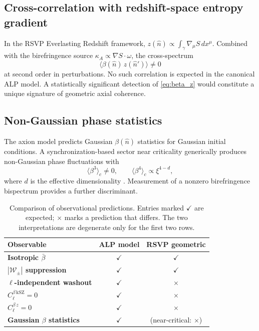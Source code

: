 \documentclass[12pt]{article}
\theoremstyle{definition}
\newcommand{\kA}{\kappa_A}
\newcommand{\Wpm}{\mathcal{W}_\pm}
\begin{document}
\subsection{Cross-correlation with redshift-space entropy gradient}

In the RSVP Everlasting Redshift framework, $z(\hat{n})\propto
\int_\gamma\nabla_\mu S\,dx^\mu$.
Combined with the birefringence source $\kA\propto\nabla S\cdot\omega$,
the cross-spectrum
\begin{equation}
  \langle\beta(\hat{n})\,z(\hat{n}')\rangle\neq0
  \label{eq:beta_z}
\end{equation}
at second order in perturbations.
No such correlation is expected in the canonical ALP model.
A statistically significant detection of \eqref{eq:beta_z} would
constitute a unique signature of geometric axial coherence.

\subsection{Non-Gaussian phase statistics}

The axion model predicts Gaussian $\beta(\hat{n})$ statistics for Gaussian
initial conditions.
A synchronization-based sector near criticality generically produces
non-Gaussian phase fluctuations with
\begin{equation}
  \langle\beta^3\rangle_c\neq0,
  \qquad
  \langle\beta^4\rangle_c\propto\xi^{4-d},
\end{equation}
where $d$ is the effective dimensionality \cite{Goldenfeld1992,Zinn-Justin2002}.
Measurement of a nonzero birefringence bispectrum \cite{Yadav2012}
provides a further discriminant.

\begin{table}[h]
\centering
\small
\renewcommand{\arraystretch}{1.35}
\begin{tabular}{>{\bfseries}lcc}
  \toprule
  Observable & ALP model & RSVP geometric \\
  \midrule
  Isotropic $\bar\beta$ & $\checkmark$ & $\checkmark$ \\
  $|\Wpm|$ suppression & $\checkmark$ & $\checkmark$ \\
  $\ell$-independent washout & $\checkmark$ & $\times$ \\
  $C_\ell^{\beta\,\mathrm{kSZ}}=0$ & $\checkmark$ & $\times$ \\
  $C_\ell^{\beta\,z}=0$ & $\checkmark$ & $\times$ \\
  Gaussian $\beta$ statistics & $\checkmark$ & (near-critical: $\times$) \\
  \bottomrule
\end{tabular}
\caption{Comparison of observational predictions.
  Entries marked $\checkmark$ are expected;
  $\times$ marks a prediction that differs.
  The two interpretations are degenerate only for the first two rows.}
\label{tab:discriminants}
\end{table}
\end{document}
